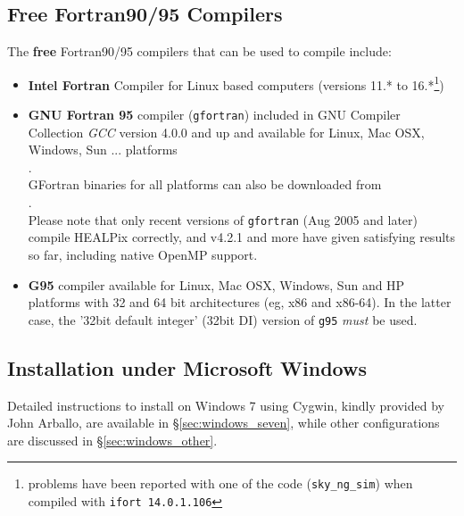 \documentclass[12pt,twoside]{article}
\begin{document}
\subsection{Free Fortran90/95 Compilers}
\label{sec:freef90compilers}
The {\bf free} Fortran90/95 compilers that can be used to compile \healpix include: 
    \begin{itemize}
      \item {\bf Intel Fortran} Compiler for Linux based computers (versions
11.* to 16.*\footnote{problems have been reported with one of the code ({\tt sky\_ng\_sim}) when compiled with
{\tt ifort 14.0.1.106}}) \hfill \\
      \item {\bf GNU Fortran 95} compiler ({\tt gfortran}) included in GNU Compiler Collection {\em GCC} version 4.0.0
         and up and available for Linux, Mac OSX, Windows, Sun ... platforms
         \hfill \\
          . \hfill \\
         GFortran binaries for all platforms can also be downloaded from  \hfill \\
          . \hfill \\
         Please note that only recent versions of {\tt gfortran} (Aug 2005
         and later) compile HEALPix correctly, and v4.2.1 and more have given satisfying
         results so far, including native OpenMP support.
     \item {\bf G95} compiler available for Linux, Mac OSX, Windows, Sun and HP platforms with 32 and 64 bit architectures (eg, x86 and x86-64). In the latter case, the '32bit default integer' (32bit DI) version of {\tt g95} {\em must} be used.
         \hfill \\ 
    \end{itemize}

\newpage %
\subsection{Installation under Microsoft Windows}
\label{sec:windows}
Detailed instructions to install \healpix on Windows 7 using Cygwin, kindly provided by John Arballo, 
are available in \S\ref{sec:windows_seven}, 
while other configurations are discussed in \S\ref{sec:windows_other}.
\end{document}
